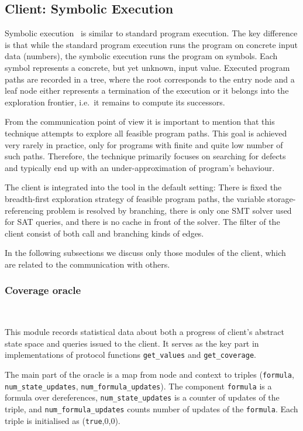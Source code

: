 \documentclass[envcountsame]{llncs}
\begin{document}
\subsection{Client: Symbolic Execution}
\label{sec:SymbolicExecution}

Symbolic execution~\cite{SE_King76} is similar to standard program execution.
The key difference is that while the standard program execution runs the program
on concrete input data (numbers), the symbolic execution runs the program on
symbols. Each symbol represents a concrete, but yet unknown, input value.
Executed program paths are recorded in a tree, where the root corresponds to the
entry node and a leaf node either represents a termination of the execution or
it belongs into the exploration frontier, i.e.~it remains to compute its
successors.

From the communication point of view it is important to mention that this
technique attempts to explore all feasible program paths. This goal is achieved
very rarely in practice, only for programs with finite and quite low number of
such paths. Therefore, the technique primarily focuses on searching for defects
and typically end up with an under-approximation of program's behaviour.

The client is integrated into the tool in the default setting: There is fixed the
breadth-first exploration strategy of feasible program paths, the variable
storage-referencing problem is resolved by branching, there is only one SMT
solver used for SAT queries, and there is no cache in front of the solver. The
filter of the client consist of both call and branching kinds of edges.

In the following subsections we discuss only those modules of the client, which
are related to the communication with others.

\subsubsection{Coverage oracle}~\\
\label{sec:CoverageSracleSE}

This module records statistical data about both a progress of client's abstract
state space and queries issued to the client. It serves as the key part in
implementations of protocol functions \texttt{get\_values} and
\texttt{get\_coverage}.

The main part of the oracle is a map from node and context to triples
(\texttt{formula}, \texttt{num\_state\_updates},
\texttt{num\_formula\_updates}). The component \texttt{formula} is a formula
over dereferences, \texttt{num\_state\_updates} is a counter of updates of the
triple, and \texttt{num\_formula\_updates} counts number of updates of the
\texttt{formula}. Each triple is initialised as (\texttt{true},0,0).
\end{document}
